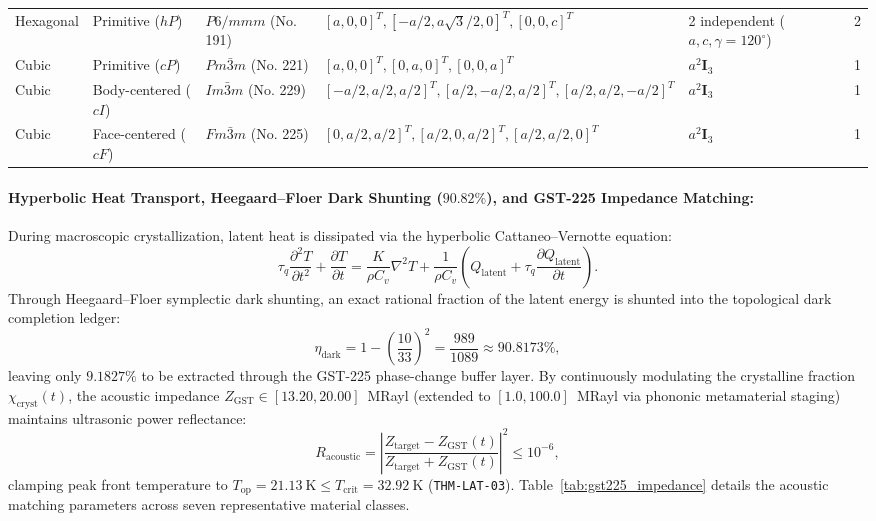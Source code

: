\documentclass[11pt,onecolumn]{article}
\begin{document}
\begin{table}[!htbp]
{\begin{tabular}{@{}l l l l l c@{}}
Hexagonal & Primitive ($hP$) & $P6/mmm$ (No. 191) & $[a,0,0]^T, [-a/2, a\sqrt{3}/2, 0]^T, [0,0,c]^T$ & 2 independent ($a,c,\gamma=120^\circ$) & 2 \\
Cubic & Primitive ($cP$) & $Pm\bar{3}m$ (No. 221) & $[a,0,0]^T, [0,a,0]^T, [0,0,a]^T$ & $a^2 \mathbf{I}_3$ & 1 \\
Cubic & Body-centered ($cI$) & $Im\bar{3}m$ (No. 229) & $[-a/2, a/2, a/2]^T, [a/2,-a/2, a/2]^T, [a/2, a/2,-a/2]^T$ & $a^2 \mathbf{I}_3$ & 1 \\
Cubic & Face-centered ($cF$) & $Fm\bar{3}m$ (No. 225) & $[0, a/2, a/2]^T, [a/2, 0, a/2]^T, [a/2, a/2, 0]^T$ & $a^2 \mathbf{I}_3$ & 1 \\
\bottomrule
\end{tabular}%
}
\end{table}
\FloatBarrier

\paragraph{Hyperbolic Heat Transport, Heegaard--Floer Dark Shunting ($90.82\%$), and GST-225 Impedance Matching:}
During macroscopic crystallization, latent heat is dissipated via the hyperbolic Cattaneo--Vernotte equation:
\begin{equation}
\tau_q \frac{\partial^2 T}{\partial t^2} + \frac{\partial T}{\partial t} = \frac{K}{\rho C_v} \nabla^2 T + \frac{1}{\rho C_v}\left(Q_{\text{latent}} + \tau_q \frac{\partial Q_{\text{latent}}}{\partial t}\right).
\end{equation}
Through Heegaard--Floer symplectic dark shunting, an exact rational fraction of the latent energy is shunted into the topological dark completion ledger:
\begin{equation}
\eta_{\text{dark}} = 1 - \left(\frac{10}{33}\right)^2 = \frac{989}{1089} \approx 90.8173\%,
\end{equation}
leaving only $9.1827\%$ to be extracted through the GST-225 phase-change buffer layer. By continuously modulating the crystalline fraction $\chi_{\text{cryst}}(t)$, the acoustic impedance $Z_{\text{GST}} \in [13.20, 20.00]$~MRayl (extended to $[1.0, 100.0]$~MRayl via phononic metamaterial staging) maintains ultrasonic power reflectance:
\begin{equation}
R_{\text{acoustic}} = \left| \frac{Z_{\text{target}} - Z_{\text{GST}}(t)}{Z_{\text{target}} + Z_{\text{GST}}(t)} \right|^2 \le 10^{-6},
\end{equation}
clamping peak front temperature to $T_{\text{op}} = 21.13~\text{K} \le T_{\text{crit}} = 32.92~\text{K}$ (\texttt{THM-LAT-03}). Table~\ref{tab:gst225_impedance} details the acoustic matching parameters across seven representative material classes.
\end{document}
